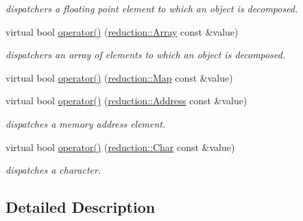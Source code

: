 \begin{DoxyCompactItemize}
\begin{DoxyCompactList}\small\item\em dispatchers a floating point element to which an object is decomposed. \end{DoxyCompactList}\item 
\hypertarget{classhryky_1_1reduction_1_1_stream_a598f5d80a4e694f96b73a99270d6ede7}{virtual bool \hyperlink{classhryky_1_1reduction_1_1_stream_a598f5d80a4e694f96b73a99270d6ede7}{operator()} (\hyperlink{classhryky_1_1reduction_1_1_array}{reduction\-::\-Array} const \&value)}\label{classhryky_1_1reduction_1_1_stream_a598f5d80a4e694f96b73a99270d6ede7}

\begin{DoxyCompactList}\small\item\em dispatchers an array of elements to which an object is decomposed. \end{DoxyCompactList}\item 
virtual bool \hyperlink{classhryky_1_1reduction_1_1_stream_a61e65ade4befc36dd0119ea6c16d1f3c}{operator()} (\hyperlink{classhryky_1_1reduction_1_1_map}{reduction\-::\-Map} const \&value)
\item 
\hypertarget{classhryky_1_1reduction_1_1_stream_a278377a56ed28a05e782cb4612f5e6e0}{virtual bool \hyperlink{classhryky_1_1reduction_1_1_stream_a278377a56ed28a05e782cb4612f5e6e0}{operator()} (\hyperlink{classhryky_1_1reduction_1_1_address}{reduction\-::\-Address} const \&value)}\label{classhryky_1_1reduction_1_1_stream_a278377a56ed28a05e782cb4612f5e6e0}

\begin{DoxyCompactList}\small\item\em dispatches a memory address element. \end{DoxyCompactList}\item 
\hypertarget{classhryky_1_1reduction_1_1_stream_a58305f4a500836101b55410729ca82a1}{virtual bool \hyperlink{classhryky_1_1reduction_1_1_stream_a58305f4a500836101b55410729ca82a1}{operator()} (\hyperlink{classhryky_1_1reduction_1_1_char}{reduction\-::\-Char} const \&value)}\label{classhryky_1_1reduction_1_1_stream_a58305f4a500836101b55410729ca82a1}

\begin{DoxyCompactList}\small\item\em dispatches a character. \end{DoxyCompactList}\end{DoxyCompactItemize}


\subsection{Detailed Description}
